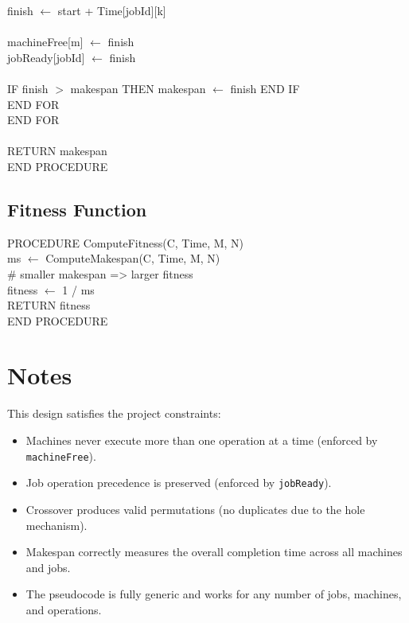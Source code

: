 \documentclass[10pt,twocolumn]{article}
\begin{document}
{\hspace*{15pt}finish $\leftarrow$ start + Time[jobId][k]\\
\\
\hspace*{15pt}machineFree[m] $\leftarrow$ finish\\
\hspace*{15pt}jobReady[jobId] $\leftarrow$ finish\\
\\
\hspace*{15pt}IF finish $>$ makespan THEN makespan $\leftarrow$ finish END IF\\
\hspace*{10pt}END FOR\\
\hspace*{5pt}END FOR\\
\\
\hspace*{5pt}RETURN makespan\\
END PROCEDURE
}

\vspace{2pt}

\subsection*{Fitness Function}

{\small\ttfamily
PROCEDURE ComputeFitness(C, Time, M, N)\\
\hspace*{5pt}ms $\leftarrow$ ComputeMakespan(C, Time, M, N)\\
\hspace*{5pt}\# smaller makespan => larger fitness\\
\hspace*{5pt}fitness $\leftarrow$ 1 / ms\\
\hspace*{5pt}RETURN fitness\\
END PROCEDURE
}



\vspace{-6pt}

\section{Notes}

This design satisfies the project constraints:
\begin{itemize}[leftmargin=10pt]
\item Machines never execute more than one operation at a time (enforced by \texttt{machineFree}).
\item Job operation precedence is preserved (enforced by \texttt{jobReady}).
\item Crossover produces valid permutations (no duplicates due to the hole mechanism).
\item Makespan correctly measures the overall completion time across all machines and jobs.
\item The pseudocode is fully generic and works for any number of jobs, machines, and operations.
\end{itemize}
\end{document}
